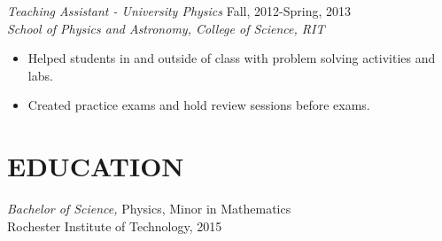 \documentclass[margin]{res}
\begin{document}
\begin{resume}
  {\sl Teaching Assistant - University Physics} \hfill            Fall, 2012-Spring, 2013 \\
  {\sl School of Physics and Astronomy, College of Science, RIT}\\
  \begin{itemize}
    \item Helped students in and outside of class with problem solving activities and labs.
    \item Created practice exams and hold review sessions before exams.
  \end{itemize}


\section{EDUCATION}
  {\sl Bachelor of Science,} Physics, Minor in Mathematics \\
  Rochester Institute of Technology, 2015	\\



\end{resume}
\end{document}
